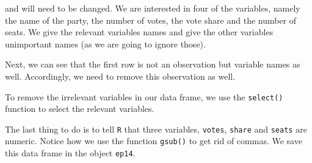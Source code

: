 \documentclass[12pt,oneside]{reedthesis}
\theoremstyle{definition}
\theoremstyle{definition}
\theoremstyle{definition}
\theoremstyle{remark}
\begin{document}
  and will need to be changed. We are interested in four of the variables,
  namely the name of the party, the number of votes, the vote share and
  the number of seats. We give the relevant variables names and give the
  other variables unimportant names (as we are going to ignore those).
  \begin{Shaded}
  \begin{Highlighting}[]
  \StringTok{ }\NormalTok{(}\NormalTok{, }\NormalTok{, }\NormalTok{, }\NormalTok{, }\NormalTok{, }
                       \NormalTok{, }\NormalTok{, }\NormalTok{, }\NormalTok{, }\NormalTok{)}
  \end{Highlighting}
  \end{Shaded}
  Next, we can see that the first row is not an observation but variable
  names as well. Accordingly, we need to remove this observation as well.
  \begin{Shaded}
  \begin{Highlighting}[]
  \StringTok{ }\NormalTok{ep14_raw[}\OperatorTok{-}\NormalTok{(}\NormalTok{), ]}
  \end{Highlighting}
  \end{Shaded}
  To remove the irrelevant variables in our data frame, we use the
  \texttt{select()} function to select the relevant variables.
  \begin{Shaded}
  \end{Shaded}
  The last thing to do is to tell \texttt{R} that three variables,
  \texttt{votes}, \texttt{share} and \texttt{seats} are numeric. Notice
  how we use the function \texttt{gsub()} to get rid of commas. We save
  this data frame in the object \texttt{ep14}.
  \begin{Shaded}
  \end{Shaded}
\end{document}
